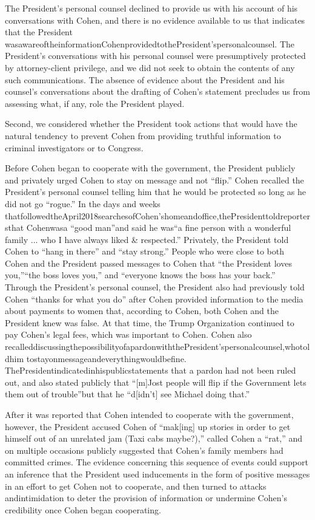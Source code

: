 {The President's personal counsel declined to provide us with his account of his conversations with Cohen, and there is no evidence available to us that indicates that the President wasawareoftheinformationCohenprovidedtothePresident'spersonalcounsel. The President's conversations with his personal counsel were presumptively protected by attorney-client privilege, and we did not seek to obtain the contents of any such communications. The absence of evidence about the President and his counsel's conversations about the drafting of Cohen's statement precludes us from assessing what, if any, role the President played.

Second, we considered whether the President took actions that would have the natural tendency to prevent Cohen from providing truthful information to criminal investigators or to Congress.

Before Cohen began to cooperate with the government, the President publicly and privately urged Cohen to stay on message and not “flip.” Cohen recalled the President's personal counsel telling him that he would be protected so long as he did not go “rogue.” In the days and weeks thatfollowedtheApril2018searchesofCohen'shomeandoffice,thePresidenttoldreportersthat Cohenwasa “good man”and said he was“a fine person with a wonderful family ... who I have always liked & respected.” Privately, the President told Cohen to “hang in there” and “stay strong.” People who were close to both Cohen and the President passed messages to Cohen that “the President loves you,”“the boss loves you,” and “everyone knows the boss has your back.” Through the President's personal counsel, the President also had previously told Cohen “thanks for what you do” after Cohen provided information to the media about payments to women that, according to Cohen, both Cohen and the President knew was false. At that time, the Trump Organization continued to pay Cohen's legal fees, which was important to Cohen. Cohen also recalleddiscussingthepossibilityofapardonwiththePresident'spersonalcounsel,whotoldhim tostayonmessageandeverythingwouldbefine. ThePresidentindicatedinhispublicstatements that a pardon had not been ruled out, and also stated publicly that “[m]Jost people will flip if the Government lets them out of trouble”but that he “d[idn't] see Michael doing that.”

After it was reported that Cohen intended to cooperate with the government, however, the President accused Cohen of “mak[ing] up stories in order to get himself out of an unrelated jam (Taxi cabs maybe?),” called Cohen a “rat,” and on multiple occasions publicly suggested that Cohen's family members had committed crimes. The evidence concerning this sequence of events could support an inference that the President used inducements in the form of positive messages in an effort to get Cohen not to cooperate, and then turned to attacks andintimidation to deter the provision of information or undermine Cohen's credibility once Cohen began cooperating.

}
